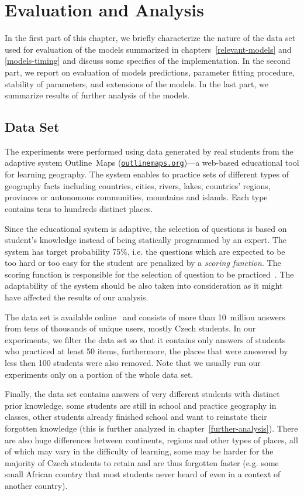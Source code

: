 \chapter{Evaluation and Analysis}
\label{analysis}

In the first part of this chapter, we briefly characterize the nature of the data set used for evaluation of the models summarized in chapters~\ref{relevant-models} and \ref{models-timing} and discuss some specifics of the implementation. In the second part, we report on evaluation of models predictions, parameter fitting procedure, stability of parameters, and extensions of the models. In the last part, we summarize results of further analysis of the models.

\section{Data Set}
\label{data-set}

The experiments were performed using data generated by real students from the adaptive system Outline~Maps (\href{http://outlinemaps.org}{\texttt{outlinemaps.org}})---a web-based educational tool for learning geography. The system enables to practice sets of different types of geography facts including countries, cities, rivers, lakes, countries' regions, provinces or autonomous communities, mountains and islands. Each type contains tens to hundreds distinct places.

Since the educational system is adaptive, the selection of questions is based on student's knowledge instead of being statically programmed by an expert. The system has target probability 75\%, i.e. the questions which are expected to be too hard or too easy for the student are penalized by a \textit{scoring function}. The scoring function is responsible for the selection of question to be practiced~\cite{Stanislav2015thesis}. The adaptability of the system should be also taken into consideration as it might have affected the results of our analysis.

The data set is available online~\cite{Papousek2015} and consists of more than 10~million answers from tens of thousands of unique users, mostly Czech students. In our experiments, we filter the data set so that it contains only answers of students who practiced at least 50 items, furthermore, the places that were answered by less then 100 students were also removed. Note that we usually run our experiments only on a portion of the whole data set.

Finally, the data set contains answers of very different students with distinct prior knowledge, some students are still in school and practice geography in classes, other students already finished school and want to reinstate their forgotten knowledge (this is further analyzed in chapter~\ref{further-analysis}). There are also huge differences between continents, regions and other types of places, all of which may vary in the difficulty of learning, some may be harder for the majority of Czech students to retain and are thus forgotten faster (e.g. some small African country that most students never heard of even in a context of another country).

